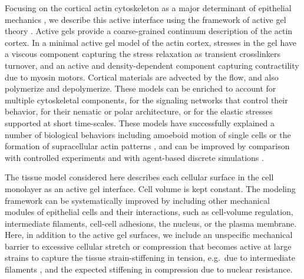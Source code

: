 Focusing on the cortical actin cytoskeleton as a major determinant of epithelial mechanics \cite{latorre2018,khalilgharibi2019,duque2023}, we describe this active interface using the framework of active gel theory \cite{Prost:2015aa}. Active gels provide a coarse-grained continuum description of the actin cortex. In a minimal active gel model of the actin cortex, stresses in the gel have a viscous component capturing the stress relaxation as transient crosslinkers turnover, and an active and density-dependent component capturing contractility due to myosin motors. Cortical materials are advected by the flow, and also polymerize and depolymerize. These models can be enriched to account for multiple cytoskeletal components, for the signaling networks that control their behavior, for their nematic or polar architecture, or for the elastic stresses supported at short time-scales. These models have successfully explained a number of biological behaviors including amoeboid motion of single cells \cite{callan2013} or the formation of supracellular actin patterns \cite{hannezo2015}, and can be improved by comparison with controlled experiments and with agent-based discrete simulations \cite{cortes2020}. 
\clearpage

The tissue model considered here describes each cellular surface in the cell monolayer as an active gel interface. Cell volume is kept constant. The modeling framework can be systematically improved by including other mechanical modules of epithelial cells and their interactions, such as cell-volume regulation, intermediate filaments, cell-cell adhesions, the nucleus, or the plasma membrane. Here, in addition to the active gel surfaces, we include an unspecific mechanical barrier to excessive cellular stretch or compression that becomes active at large strains to capture the tissue strain-stiffening in tension, e.g.~due to intermediate filaments \cite{latorre2018,duque2023}, and the expected stiffening in compression due to nuclear resistance.


